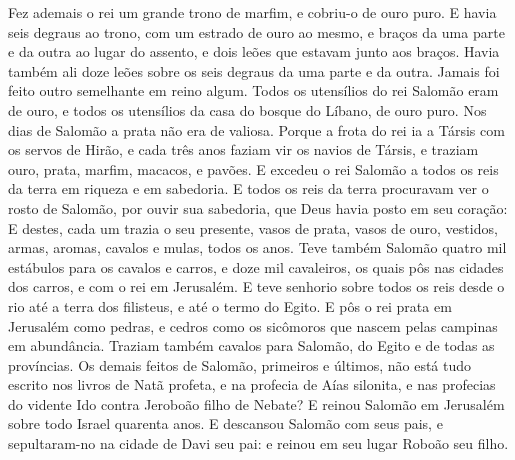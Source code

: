 {Fez ademais o rei um grande trono de marfim, e cobriu-o de ouro puro.
E havia seis degraus ao trono, com um estrado de ouro ao mesmo, e braços da uma parte e da outra ao lugar do assento, e dois leões que estavam junto aos braços.
Havia também ali doze leões sobre os seis degraus da uma parte e da outra. Jamais foi feito outro semelhante em reino algum.
Todos os utensílios do rei Salomão eram de ouro, e todos os utensílios da casa do bosque do Líbano, de ouro puro. Nos dias de Salomão a prata não era de valiosa.
Porque a frota do rei ia a Társis com os servos de Hirão, e cada três anos faziam vir os navios de Társis, e traziam ouro, prata, marfim, macacos, e pavões.
E excedeu o rei Salomão a todos os reis da terra em riqueza e em sabedoria.
E todos os reis da terra procuravam ver o rosto de Salomão, por ouvir sua sabedoria, que Deus havia posto em seu coração:
E destes, cada um trazia o seu presente, vasos de prata, vasos de ouro, vestidos, armas, aromas, cavalos e mulas, todos os anos.
Teve também Salomão quatro mil estábulos para os cavalos e carros, e doze mil cavaleiros, os quais pôs nas cidades dos carros, e com o rei em Jerusalém.
E teve senhorio sobre todos os reis desde o rio até a terra dos filisteus, e até o termo do Egito.
E pôs o rei prata em Jerusalém como pedras, e cedros como os sicômoros que nascem pelas campinas em abundância.
Traziam também cavalos para Salomão, do Egito e de todas as províncias.
Os demais feitos de Salomão, primeiros e últimos, não está tudo escrito nos livros de Natã profeta, e na profecia de Aías silonita, e nas profecias do vidente Ido contra Jeroboão filho de Nebate?
E reinou Salomão em Jerusalém sobre todo Israel quarenta anos.
E descansou Salomão com seus pais, e sepultaram-no na cidade de Davi seu pai: e reinou em seu lugar Roboão seu filho.

}
